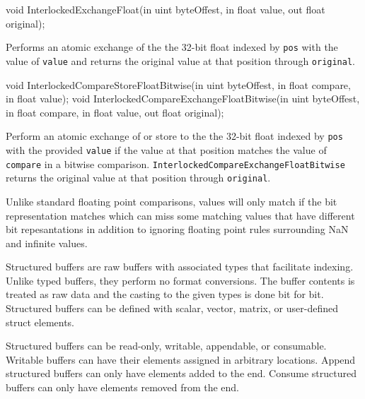 \begin{HLSL}
   void InterlockedExchangeFloat(in uint byteOffest, in float value,
                                  out float original);
\end{HLSL}

Performs an atomic exchange of the the 32-bit float indexed by \texttt{pos} with
the value of \texttt{value} and returns the original value at that position through \texttt{original}.

\begin{HLSL}
  void InterlockedCompareStoreFloatBitwise(in uint byteOffest, in float compare,
                                            in float value);
  void InterlockedCompareExchangeFloatBitwise(in uint byteOffest,
                                               in float compare,
                                               in float value,
                                               out float original);
\end{HLSL}

Perform an atomic exchange of or store to the the 32-bit float indexed by
\texttt{pos} with the provided \texttt{value} if the value at that position
matches the value of \texttt{compare} in a bitwise comparison.
\texttt{InterlockedCompareExchangeFloatBitwise} returns the original value at
that position through \texttt{original}.

Unlike standard floating point comparisons, values will only match if the bit
representation matches which can miss some matching values that have different
bit repesantations in addition to ignoring floating point rules surrounding NaN
and infinite values.


Structured buffers are raw buffers with associated types that facilitate
indexing.
Unlike typed buffers, they perform no format conversions.
The buffer contents is treated as raw data and the casting to the given types
is done bit for bit.
Structured buffers can be defined with scalar, vector, matrix, or user-defined
struct elements.


Structured buffers can be read-only, writable, appendable, or consumable.
Writable buffers can have their elements assigned in arbitrary locations.
Append structured buffers can only have elements added to the end.
Consume structured buffers can only have elements removed from the end.

